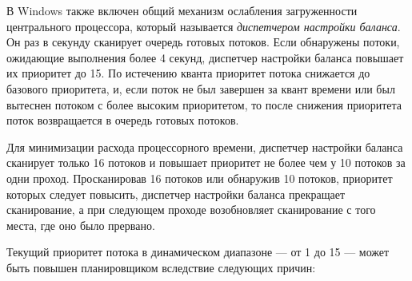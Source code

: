 В Windows также включен общий механизм ослабления загруженности центрального
процессора, который называется \textit{диспетчером настройки баланса}. Он раз в
секунду сканирует очередь готовых потоков. Если обнаружены потоки, ожидающие
выполнения более 4 секунд, диспетчер настройки баланса повышает их приоритет до
15. По истечению кванта приоритет потока снижается до базового приоритета, и,
если поток не был завершен за квант времени или был вытеснен потоком с более
высоким приоритетом, то после снижения приоритета поток возвращается в очередь
готовых потоков.

Для минимизации расхода процессорного времени, диспетчер настройки баланса
сканирует только 16 потоков и повышает приоритет не более чем у 10 потоков за
одни проход. Просканировав 16 потоков или обнаружив 10 потоков, приоритет
которых следует повысить, диспетчер настройки баланса прекращает сканирование,
а при следующем проходе возобновляет сканирование с того места, где оно было
прервано.

Текущий приоритет потока в динамическом диапазоне --- от 1 до 15 --- может быть
повышен планировщиком вследствие следующих причин:

